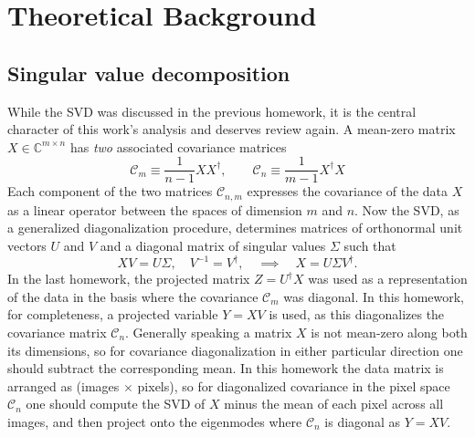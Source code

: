 \documentclass{article}
\begin{document}

\section{Theoretical Background}\label{theory}
\subsection{Singular value decomposition}
While the SVD was discussed in the previous homework, it is the central character of this work's analysis and deserves review again. A mean-zero matrix $X\in\mathbb{C}^{m\times n}$ has \textit{two} associated covariance matrices \cite{kutz}
\begin{equation}
  \mathcal{C}_m \equiv \frac{1}{n-1}XX^\dagger,\quad\quad \mathcal{C}_n \equiv \frac{1}{m-1}X^\dagger X
\end{equation}
Each component of the two matrices $\mathcal{C}_{n,m}$ expresses the covariance of the data $X$ as a linear operator between the spaces of dimension $m$ and $n$. Now the SVD, as a generalized diagonalization procedure, determines matrices of orthonormal unit vectors $U$ and $V$ and a diagonal matrix of singular values $\Sigma$ such that
\begin{equation}
  XV = U\Sigma,\quad V^{-1} = V^\dagger,\quad\implies\quad X = U\Sigma V^\dagger.
\end{equation}
In the last homework, the projected matrix $Z = U^\dagger X$ was used as a representation of the data in the basis where the covariance $\mathcal{C}_m$ was diagonal. In this homework, for completeness, a projected variable $Y = XV$ is used, as this diagonalizes the covariance matrix $\mathcal{C}_n$. Generally speaking a matrix $X$ is not mean-zero along both its dimensions, so for covariance diagonalization in either particular direction one should subtract the corresponding mean. In this homework the data matrix is arranged as (images $\times$ pixels), so for diagonalized covariance in the pixel space $\mathcal{C}_n$ one should compute the SVD of $X$ minus the mean of each pixel across all images, and then project onto the eigenmodes where $\mathcal{C}_n$ is diagonal as $Y = XV$.
\end{document}
